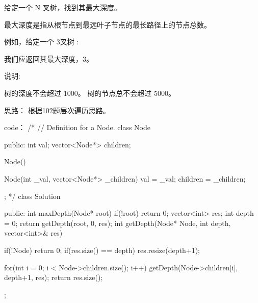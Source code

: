 给定一个 N 叉树，找到其最大深度。

最大深度是指从根节点到最远叶子节点的最长路径上的节点总数。

例如，给定一个 3叉树 :

 

 

我们应返回其最大深度，3。

说明:

    树的深度不会超过 1000。
    树的节点总不会超过 5000。

































思路：
根据102题层次遍历思路。

































code：
/*
// Definition for a Node.
class Node {
public:
    int val;
    vector<Node*> children;

    Node() {}

    Node(int _val, vector<Node*> _children) {
        val = _val;
        children = _children;
    }
};
*/
class Solution {
public:
    int maxDepth(Node* root) {
        if(!root) return 0;
        vector<int> res;
        int depth = 0;
        return getDepth(root, 0, res);
    }
    int getDepth(Node* Node, int depth, vector<int>& res)
    {
        if(!Node) return 0;
        if(res.size() == depth)
            res.resize(depth+1);
        
        for(int i = 0; i < Node->children.size(); i++)
        {
            getDepth(Node->children[i], depth+1, res);
        }
        return res.size();
    }
};